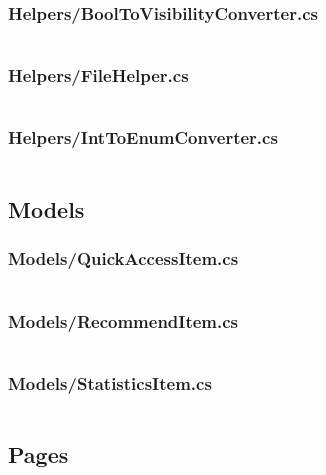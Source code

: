 \documentclass[a4paper]{report}
\begin{document}
\subsubsection{Helpers/BoolToVisibilityConverter.cs}

\inputminted{csharp}{"../src/Algorithm Dynamics/Helpers/BoolToVisibilityConverter.cs"}

\subsubsection{Helpers/FileHelper.cs}

\inputminted{csharp}{"../src/Algorithm Dynamics/Helpers/FileHelper.cs"}

\subsubsection{Helpers/IntToEnumConverter.cs}

\inputminted{csharp}{"../src/Algorithm Dynamics/Helpers/IntToEnumConverter.cs"}

\subsection{Models}

\subsubsection{Models/QuickAccessItem.cs}

\inputminted{csharp}{"../src/Algorithm Dynamics/Models/QuickAccessItem.cs"}

\subsubsection{Models/RecommendItem.cs}

\inputminted{csharp}{"../src/Algorithm Dynamics/Models/RecommendItem.cs"}

\subsubsection{Models/StatisticsItem.cs}

\inputminted{csharp}{"../src/Algorithm Dynamics/Models/StatisticsItem.cs"}

\subsection{Pages}
\end{document}
